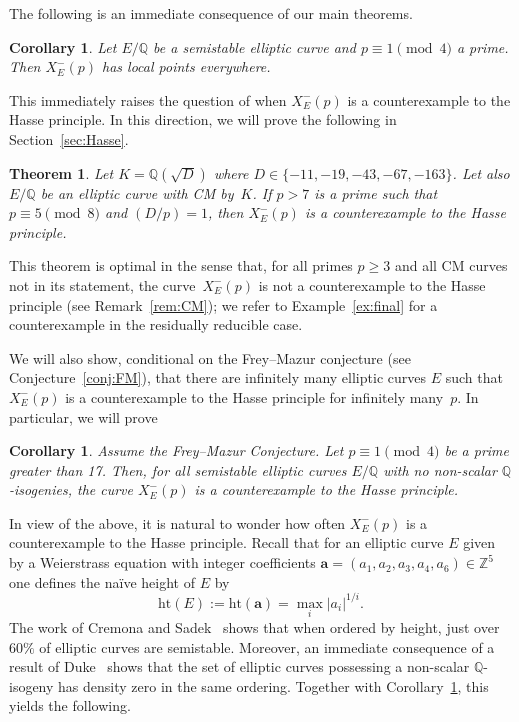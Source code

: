 \documentclass[12pt]{amsart}
\numberwithin{equation}{section}
\newtheorem{theorem}[equation]{Theorem}
\newtheorem{corollary}[equation]{Corollary}
\theoremstyle{definition}
\newcommand{\Q}{\mathbb{Q}}
\newcommand{\Z}{\mathbb{Z}}
\newcommand{\Xp}{X_E^{-}(p)}
\begin{document}
The following is an immediate consequence of our main theorems.

\begin{corollary}\label{cor:semistable}
Let $E/\Q$ be a semistable elliptic curve and $p \equiv 1 \pmod{4}$ a prime. Then $\Xp$ has local points everywhere.
\end{corollary}
This immediately raises the question of when $\Xp$ is a counterexample to the Hasse principle. In this direction, we will prove the following in Section~\ref{sec:Hasse}.
\begin{theorem}\label{thm:conterHasseCM}
Let $K=\Q(\sqrt{D})$ where $D \in \{-11,-19,-43,-67,-163 \}$. Let also $E/\Q$ be an elliptic curve with CM by~$K$. If $p > 7$ is a prime such that $p \equiv 5 \pmod{8}$ and $(D / p) = 1$, then $\Xp$ is a counterexample to the Hasse principle.
\end{theorem}
This theorem is optimal in the sense that, for all primes $p \geq 3$ and all CM curves not in its statement, the curve~$\Xp$ is not a counterexample to the Hasse principle (see Remark~\ref{rem:CM}); we refer to Example~\ref{ex:final} for a counterexample in the residually reducible case.

We will also show, conditional on the Frey--Mazur conjecture (see Conjecture~\ref{conj:FM}),
that there are infinitely many elliptic curves $E$ such that $\Xp$ is a
counterexample to the Hasse principle for infinitely many~$p$. In particular, we will prove
\begin{corollary} \label{cor:Frey-MazurSimple} Assume the Frey--Mazur Conjecture.
   Let $p \equiv 1 \pmod{4}$ be a prime greater than 17.
   Then, for all semistable elliptic curves $E/\Q$ with no non-scalar $\Q$-isogenies, the curve $X_E^-(p)$ is a counterexample to the Hasse principle.
\end{corollary}
In view of the above, it is natural to wonder how often $\Xp$ is a counterexample to the Hasse principle.
Recall that for an elliptic curve $E$ given by a Weierstrass equation with integer coefficients $\mathbf{a} = (a_1, a_2, a_3, a_4, a_6) \in \Z^5$ one defines the na\"ive height of $E$ by 
\[
\text{ht}(E):= \text{ht}(\mathbf{a})=\max_i|a_i|^{1/i}.
\]
The work of Cremona and Sadek~\cite[Theorem 1.1]{Cresad} shows that when ordered by height, just over $60\%$ of elliptic curves are semistable. Moreover, an immediate consequence of a result of Duke~\cite[Theorem 1]{Duke} shows that 
the set of elliptic curves possessing a non-scalar $\Q$-isogeny has density zero in the same ordering. Together with Corollary~\ref{cor:Frey-MazurSimple}, this yields the following.
\end{document}
